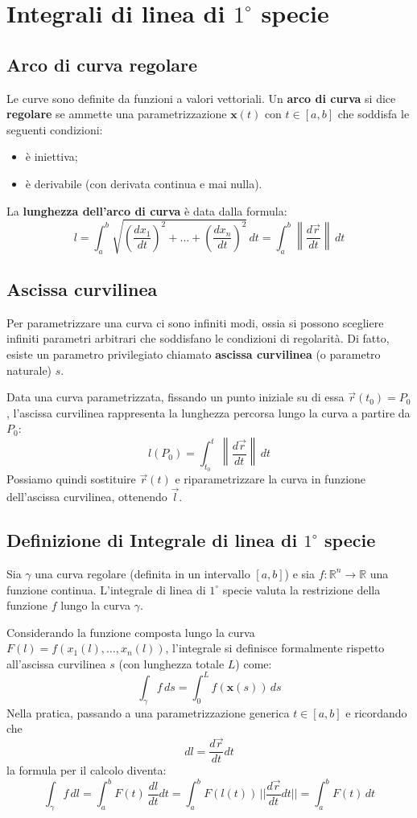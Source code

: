 \chapter{Integrali di linea di $1^\circ$ specie}

\section{Arco di curva regolare}
Le curve sono definite da funzioni a valori vettoriali. Un \textbf{arco di curva} si dice \textbf{regolare} se ammette una parametrizzazione $\mathbf{x}(t)$ con $t \in [a,b]$ che soddisfa le seguenti condizioni:
\begin{itemize}
    \item è iniettiva;
    \item è derivabile (con derivata continua e mai nulla).
\end{itemize}

La \textbf{lunghezza dell'arco di curva} è data dalla formula:
\[
l = \int_{a}^{b} \sqrt{\left(\frac{dx_1}{dt}\right)^2 + \dots + \left(\frac{dx_n}{dt}\right)^2} \, dt = \int_{a}^{b} \left\| \frac{d\vec{r}}{dt} \right\| \, dt
\]

\section{Ascissa curvilinea}
Per parametrizzare una curva ci sono infiniti modi, ossia si possono scegliere infiniti parametri arbitrari che soddisfano le condizioni di regolarità. Di fatto, esiste un parametro privilegiato chiamato \textbf{ascissa curvilinea} (o parametro naturale) $s$.

Data una curva parametrizzata, fissando un punto iniziale su di essa $\vec{r}(t_0)=P_0$, l'ascissa curvilinea rappresenta la lunghezza percorsa lungo la curva a partire da $P_0$:
\[
l(P_0) = \int_{t_0}^{t} \left\| \frac{d\vec{r}}{dt} \right\| \, dt
\]
Possiamo quindi sostituire $\vec{r}(t)$ e riparametrizzare la curva in funzione dell'ascissa curvilinea, ottenendo $\vec{l}$.

\section{Definizione di Integrale di linea di $1^\circ$ specie}
Sia $\gamma$ una curva regolare (definita in un intervallo $[a,b]$) e sia $f: \mathbb{R}^n \rightarrow \mathbb{R}$ una funzione continua. 
L'integrale di linea di $1^\circ$ specie valuta la restrizione della funzione $f$ lungo la curva $\gamma$.

Considerando la funzione composta lungo la curva $F(l) = f(x_1(l), \dots, x_n(l))$, l'integrale si definisce formalmente rispetto all'ascissa curvilinea $s$ (con lunghezza totale $L$) come:
\[
\int_{\gamma} f \, ds = \int_{0}^{L} f(\mathbf{x}(s)) \, ds
\]
Nella pratica, passando a una parametrizzazione generica $t \in [a,b]$ e ricordando che 
\[
dl = \frac{d\vec{r}}{dt} dt
\]
la formula per il calcolo diventa:
\[
\int_{\gamma} f \, dl = \int_a^b F(t) \, \frac{dl}{dt}dt = \int_a^b F(l(t)) \, ||\frac{d\vec{r}}{dt}dt|| = \int_a^b F(t) \, dt
\]
